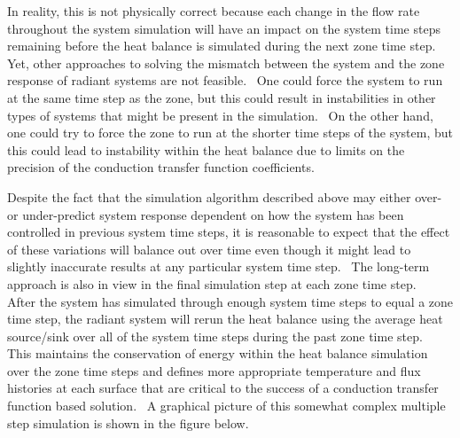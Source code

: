 In reality, this is not physically correct because each change in the flow rate throughout the system simulation will have an impact on the system time steps remaining before the heat balance is simulated during the next zone time step.~ Yet, other approaches to solving the mismatch between the system and the zone response of radiant systems are not feasible.~ One could force the system to run at the same time step as the zone, but this could result in instabilities in other types of systems that might be present in the simulation.~ On the other hand, one could try to force the zone to run at the shorter time steps of the system, but this could lead to instability within the heat balance due to limits on the precision of the conduction transfer function coefficients.

Despite the fact that the simulation algorithm described above may either over- or under-predict system response dependent on how the system has been controlled in previous system time steps, it is reasonable to expect that the effect of these variations will balance out over time even though it might lead to slightly inaccurate results at any particular system time step.~ The long-term approach is also in view in the final simulation step at each zone time step.~ After the system has simulated through enough system time steps to equal a zone time step, the radiant system will rerun the heat balance using the average heat source/sink over all of the system time steps during the past zone time step.~ This maintains the conservation of energy within the heat balance simulation over the zone time steps and defines more appropriate temperature and flux histories at each surface that are critical to the success of a conduction transfer function based solution.~ A graphical picture of this somewhat complex multiple step simulation is shown in the figure below.


